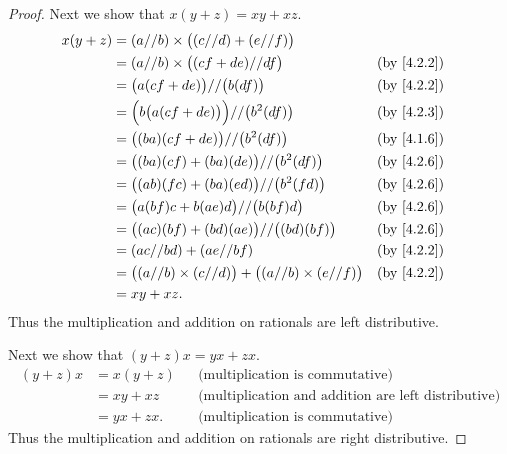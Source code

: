 \begin{proof}
  Next we show that \(x(y + z) = xy + xz\).
  \begin{align*}
    x(y + z) & = (a // b) \times \big((c // d) + (e // f)\big)                                                         \\
             & = (a // b) \times \big((cf + de) // df\big)                               &  & \text{(by \cref{4.2.2})} \\
             & = \big(a(cf + de)\big) // \big(b(df)\big)                                 &  & \text{(by \cref{4.2.2})} \\
             & = \Big(b\big(a(cf + de)\big)\Big) // \big(b^2(df)\big)                    &  & \text{(by \cref{4.2.3})} \\
             & = \big((ba)(cf + de)\big) // \big(b^2(df)\big)                            &  & \text{(by \cref{4.1.6})} \\
             & = \big((ba)(cf) + (ba)(de)\big) // \big(b^2(df)\big)                      &  & \text{(by \cref{4.2.6})} \\
             & = \big((ab)(fc) + (ba)(ed)\big) // \big(b^2(fd)\big)                      &  & \text{(by \cref{4.2.6})} \\
             & = \big(a(bf)c + b(ae)d\big) // \big(b(bf)d\big)                           &  & \text{(by \cref{4.2.6})} \\
             & = \big((ac)(bf) + (bd)(ae)\big) // \big((bd)(bf)\big)                     &  & \text{(by \cref{4.2.6})} \\
             & = (ac // bd) + (ae // bf)                                                 &  & \text{(by \cref{4.2.2})} \\
             & = \big((a // b) \times (c // d)\big) + \big((a // b) \times (e // f)\big) &  & \text{(by \cref{4.2.2})} \\
             & = xy + xz.
  \end{align*}
  Thus the multiplication and addition on rationals are left distributive.

  Next we show that \((y + z)x = yx + zx\).
  \begin{align*}
    (y + z)x & = x(y + z) &  & \text{(multiplication is commutative)}                     \\
             & = xy + xz  &  & \text{(multiplication and addition are left distributive)} \\
             & = yx + zx. &  & \text{(multiplication is commutative)}
  \end{align*}
  Thus the multiplication and addition on rationals are right distributive.


\end{proof}
